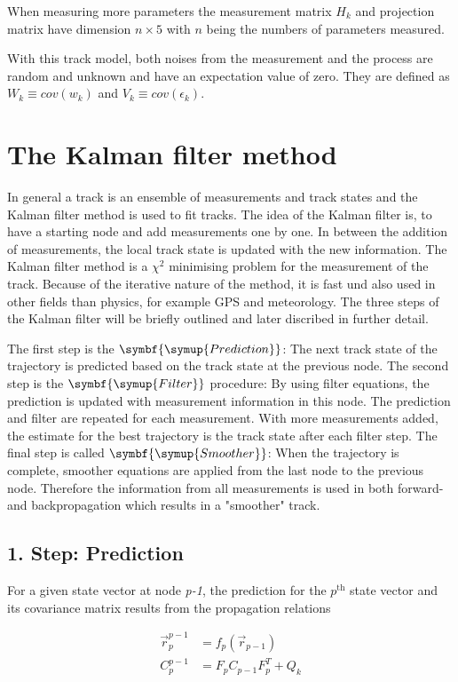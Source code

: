 When measuring more parameters the measurement matrix $H_k$ and projection matrix have dimension $n\times5$ with $n$ being the numbers of parameters measured.

With this track model, both noises from the measurement and the process are random and unknown and have an expectation value of zero.
They are defined as $W_k \equiv cov(w_k)$ and $V_k \equiv cov(\epsilon_k)$.

\section{The Kalman filter method \cite{VanTilburg}}
In general a track is an ensemble of measurements and track states and the Kalman filter method is used to fit tracks.
The idea of the Kalman filter is, to have a starting node and add measurements one by one. In between the addition of measurements, the local track state is updated with the new information.
The Kalman filter method is a $\chi^2$ minimising problem for the measurement of the track. Because of the iterative nature of the method, it is fast und also used in other fields than physics, for example GPS and meteorology.
The three steps of the Kalman filter will be briefly outlined and later discribed in further detail.


The first step is the $\symbf{\symup{Prediction}}$: The next track state of the trajectory is predicted based on the track state at the previous node.
The second step is the $\symbf{\symup{Filter}}$ procedure: By using filter equations, the prediction is updated with measurement information in this node. The prediction and filter are repeated for each measurement. With more measurements added, the estimate for the best trajectory is the track state after each filter step.
The final step is called $\symbf{\symup{Smoother}}$: When the trajectory is complete, smoother equations are applied from the last node to the previous node. Therefore the information from all measurements is used in both forward- and backpropagation which results in a "smoother" track.

\subsection{1. Step: Prediction}
For a given state vector at node \textit{p-1}, the prediction for the $p^{\text{th}}$ state vector and its covariance matrix results from the propagation relations

\begin{align}
  \vec{r}_p^{p-1} &= f_p\left( \vec{r}_{p-1} \right) \\
  C_p^{p-1} &= F_p C_{p-1} F_p^T + Q_k
\end{align}

